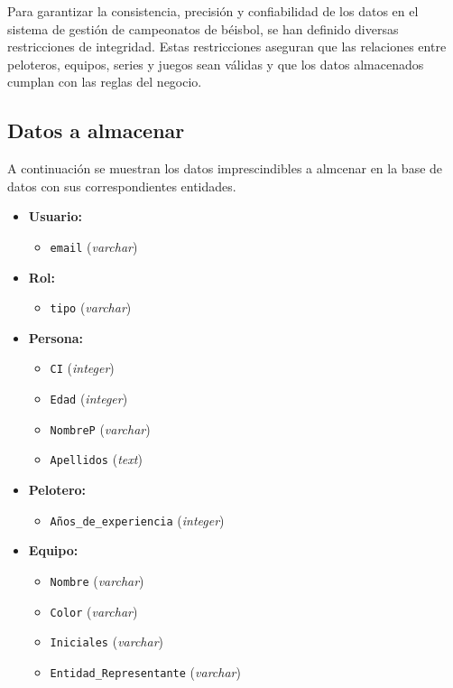 \documentclass{report}
\begin{document}
    Para garantizar la consistencia, precisión y confiabilidad de los datos en el sistema de gestión de campeonatos 
    de béisbol, se han definido diversas restricciones de integridad. Estas restricciones aseguran que las 
    relaciones entre peloteros, equipos, series y juegos sean válidas y que los datos almacenados cumplan con las 
    reglas del negocio.

    \subsection*{Datos a almacenar}
    
    A continuación se muestran los datos imprescindibles a almcenar en la base de datos con sus correspondientes entidades.

    \begin{itemize}
        \item \textbf{Usuario:}
        \begin{itemize}
            \item \texttt{email} (\textit{varchar})
        \end{itemize} 

        \item \textbf{Rol:}
        \begin{itemize}
            \item \texttt{tipo} (\textit{varchar})
        \end{itemize}

        \item \textbf{Persona:}
        \begin{itemize}
            \item \texttt{CI} (\textit{integer})
            \item \texttt{Edad} (\textit{integer})
            \item \texttt{NombreP} (\textit{varchar})
            \item \texttt{Apellidos} (\textit{text})
        \end{itemize}

        \item \textbf{Pelotero:}
        \begin{itemize}
            \item \texttt{Años\_de\_experiencia} (\textit{integer}) \newline
        \end{itemize}

        \item \textbf{Equipo:}
        \begin{itemize}
            \item \texttt{Nombre} (\textit{varchar})
            \item \texttt{Color} (\textit{varchar})
            \item \texttt{Iniciales} (\textit{varchar})
            \item \texttt{Entidad\_Representante} (\textit{varchar}) \newline
        \end{itemize}


\end{itemize}
\end{document}

